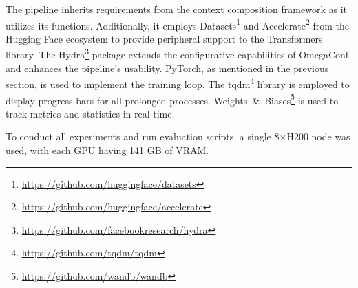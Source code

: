 The pipeline inherits requirements from the context composition framework as it utilizes its functions. Additionally, it employs Datasets\footnote{\url{https://github.com/huggingface/datasets}} and Accelerate\footnote{\url{https://github.com/huggingface/accelerate}} from the Hugging Face ecosystem to provide peripheral support to the Transformers library. The Hydra\footnote{\url{https://github.com/facebookresearch/hydra}} package extends the configurative capabilities of OmegaConf and enhances the pipeline's usability. PyTorch, as mentioned in the previous section, is used to implement the training loop. The tqdm\footnote{\url{https://github.com/tqdm/tqdm}} library is employed to display progress bars for all prolonged processes. Weights~\&~Biases\footnote{\url{https://github.com/wandb/wandb}} is used to track metrics and statistics in real-time.

To conduct all experiments and run evaluation scripts, a single 8\(\times\)H200 node was used, with each GPU having 141 GB of VRAM.
